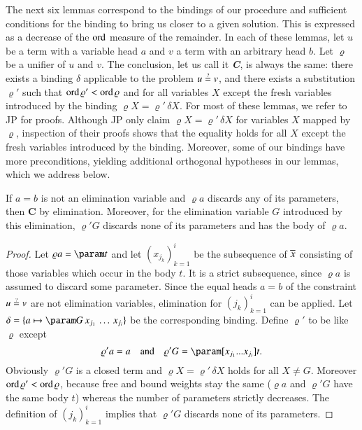     The next six lemmas correspond to the bindings of our procedure and sufficient
    conditions for the binding to bring us closer to a given solution. 
    This is expressed as a decrease of the $\operatorname{ord}$ measure
    of the remainder. In each of these lemmas, 
    let $u$ be a term with a variable head $a$ and
    $v$ a term with an arbitrary head $b$.
    Let $\varrho$ be a unifier of $u$ and $v$.
    The conclusion, let us call it \textbf{\emph{C}},
    is always the same: there exists a binding $\delta$ applicable to the problem $ u\unif v$, and
    there exists a substitution $\varrho'$ such that $\operatorname{ord}\varrho'<\operatorname{ord}\varrho$
    and for all variables $X$ except the fresh variables introduced by the binding $\varrho X= \varrho'\, \delta X$.
    For most of these lemmas, we refer to JP \cite{jp-76-unif} for proofs.
    Although JP only claim $\varrho X= \varrho'\, \delta X$
    for variables $X$ mapped by $\varrho$,
    inspection of their proofs shows that the equality holds for 
    all $X$ except the fresh variables introduced by the binding.
    Moreover, some of our bindings have more preconditions, 
    yielding additional orthogonal hypotheses in our lemmas,
    which we address below.

    \begin{lemma}
    [$\jp L9$]\label{lem:elimination}If $a=b$ is not an elimination variable and $\varrho a$
    discards any of its parameters, then \textbf{C} by elimination.
    Moreover, for the elimination variable $G$ introduced by this elimination,
    $\varrho'G$ discards none of its parameters and has the body of $\varrho a$.
    \end{lemma}
    \begin{proof}
    Let $\varrho a=\param t$ and let $\left(x_{j_{k}}\right)_{k=1}^{i}$
    be the subsequence of $\overline{x}$ consisting of those variables which
    occur in the body $t$. It is a strict subsequence,\emph{ }since $\varrho a$
    is assumed to discard some parameter. Since the equal heads $a=b$ of the
    constraint $u\unif v$ are not elimination variables, elimination
    for $(j_{k})_{k=1}^{i}$ can be applied. Let $\delta=\{ a\mapsto\param G\,x_{j_{1}}\,\ldots\,x_{j_{i}}\} $
    be the corresponding binding. Define $\varrho'$ to be like $\varrho$
    except
    \[
    \varrho'a=a\quad\text{and}\quad\varrho'G=\param[x_{j_{1}}...x_{j_{i}}]t.
    \]
    Obviously $\varrho'G$ is a closed term and $\varrho X = \varrho'\,\delta X$
    holds for all $X \not= G$. Moreover $\operatorname{ord}\varrho'<\operatorname{ord}\varrho$, because
    free and bound weights stay the same ($\varrho a$ and $\varrho'G$ have the
    same body $t$) whereas the number of parameters strictly decreases. The definition
    of $\left(j_{k}\right)_{k=1}^{i}$ implies that $\varrho'G$ discards
    none of its parameters.
    \end{proof}

